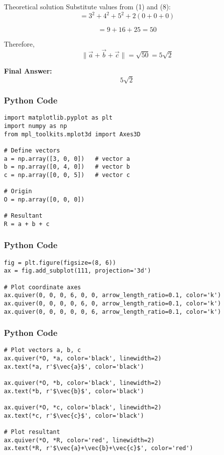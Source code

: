 \documentclass{beamer}
\begin{document}
\begin{frame}{Theoretical solution}
Substitute values from (1) and (8):
\begin{equation}
= 3^2+4^2+5^2+2(0+0+0)
\end{equation}

\begin{equation}
= 9+16+25=50
\end{equation}

Therefore,
\begin{equation}
\|\vec{a}+\vec{b}+\vec{c}\|=\sqrt{50}=5\sqrt{2}
\end{equation}

\bigskip

\textbf{Final Answer:} 
\[
\boxed{5\sqrt{2}}
\]
\end{frame}

\begin{frame}[fragile]
    \frametitle{Python Code}
    \begin{lstlisting}
import matplotlib.pyplot as plt
import numpy as np
from mpl_toolkits.mplot3d import Axes3D

# Define vectors
a = np.array([3, 0, 0])   # vector a
b = np.array([0, 4, 0])   # vector b
c = np.array([0, 0, 5])   # vector c

# Origin
O = np.array([0, 0, 0])

# Resultant
R = a + b + c

\end{lstlisting}
\end{frame}


\begin{frame}[fragile]
    \frametitle{Python Code}
    \begin{lstlisting}
fig = plt.figure(figsize=(8, 6))
ax = fig.add_subplot(111, projection='3d')

# Plot coordinate axes
ax.quiver(0, 0, 0, 6, 0, 0, arrow_length_ratio=0.1, color='k')
ax.quiver(0, 0, 0, 0, 6, 0, arrow_length_ratio=0.1, color='k')
ax.quiver(0, 0, 0, 0, 0, 6, arrow_length_ratio=0.1, color='k')

\end{lstlisting}
\end{frame}


\begin{frame}[fragile]
    \frametitle{Python Code}
    \begin{lstlisting}
# Plot vectors a, b, c
ax.quiver(*O, *a, color='black', linewidth=2)
ax.text(*a, r'$\vec{a}$', color='black')

ax.quiver(*O, *b, color='black', linewidth=2)
ax.text(*b, r'$\vec{b}$', color='black')

ax.quiver(*O, *c, color='black', linewidth=2)
ax.text(*c, r'$\vec{c}$', color='black')

# Plot resultant
ax.quiver(*O, *R, color='red', linewidth=2)
ax.text(*R, r'$\vec{a}+\vec{b}+\vec{c}$', color='red')

\end{lstlisting}
\end{frame}
\end{document}
